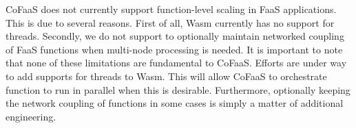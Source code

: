 CoFaaS does not currently support function-level scaling in FaaS applications. This is due to several reasons. First of all, Wasm currently has no support for threads. Secondly, we do not support to optionally maintain networked coupling of FaaS functions when multi-node processing is needed. It is important to note that none of these limitations are fundamental to CoFaaS. Efforts are under way to add supports for threads to Wasm. This will allow CoFaaS to orchestrate function to run in parallel when this is desirable.
Furthermore, optionally keeping the network coupling of functions in some cases is simply a matter of additional engineering.



